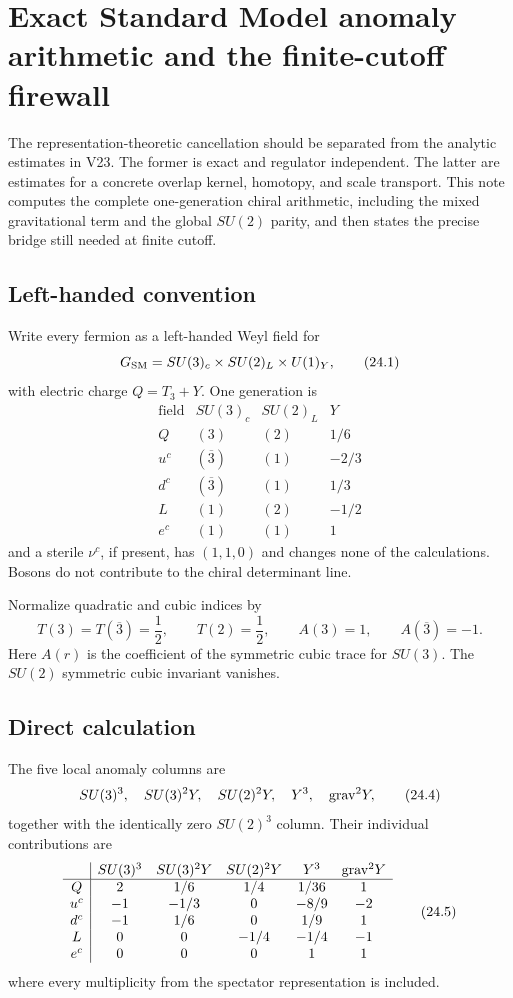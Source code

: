 \documentclass[11pt]{article}
\begin{document}
\section{Exact Standard Model anomaly arithmetic and the finite-cutoff firewall}
\label{sec:v11v24}

The representation-theoretic cancellation should be separated from the
analytic estimates in V23.  The former is exact and regulator
independent.  The latter are estimates for a concrete overlap kernel,
homotopy, and scale transport.  This note computes the complete
one-generation chiral arithmetic, including the mixed gravitational
term and the global \(SU(2)\) parity, and then states the precise bridge
still needed at finite cutoff.

\subsection{Left-handed convention}

Write every fermion as a left-handed Weyl field for
\[
 G_{\rm SM}=SU(3)_c\times SU(2)_L\times U(1)_Y,
 \tag{24.1}
\]
with electric charge \(Q=T_3+Y\).  One generation is
\[
\begin{array}{c|c|c|c}
 \text{field}&SU(3)_c&SU(2)_L&Y\\ \hline
 Q&(3)&(2)&1/6\\
 u^c&(\overline3)&(1)&-2/3\\
 d^c&(\overline3)&(1)&1/3\\
 L&(1)&(2)&-1/2\\
 e^c&(1)&(1)&1
\end{array}
\tag{24.2}
\]
and a sterile \(\nu^c\), if present, has \((1,1,0)\) and changes none of
the calculations.  Bosons do not contribute to the chiral determinant
line.

Normalize quadratic and cubic indices by
\[
 T(3)=T(\overline3)=\frac12,\qquad
 T(2)=\frac12,\qquad
 A(3)=1,\qquad A(\overline3)=-1.
 \tag{24.3}
\]
Here \(A(r)\) is the coefficient of the symmetric cubic trace for
\(SU(3)\).  The \(SU(2)\) symmetric cubic invariant vanishes.

\subsection{Direct calculation}

The five local anomaly columns are
\[
 SU(3)^3,\quad SU(3)^2Y,\quad SU(2)^2Y,\quad
 Y^3,\quad {\rm grav}^2Y,
 \tag{24.4}
\]
together with the identically zero \(SU(2)^3\) column.  Their individual
contributions are
\[
\begin{array}{c|ccccc}
 &SU(3)^3&SU(3)^2Y&SU(2)^2Y&Y^3&{\rm grav}^2Y\\ \hline
 Q   &2& 1/6& 1/4& 1/36& 1\\
 u^c &-1&-1/3&0&-8/9&-2\\
 d^c &-1& 1/6&0& 1/9& 1\\
 L   &0&0&-1/4&-1/4&-1\\
 e^c &0&0&0&1&1
\end{array}
\tag{24.5}
\]
where every multiplicity from the spectator representation is included.
\end{document}
